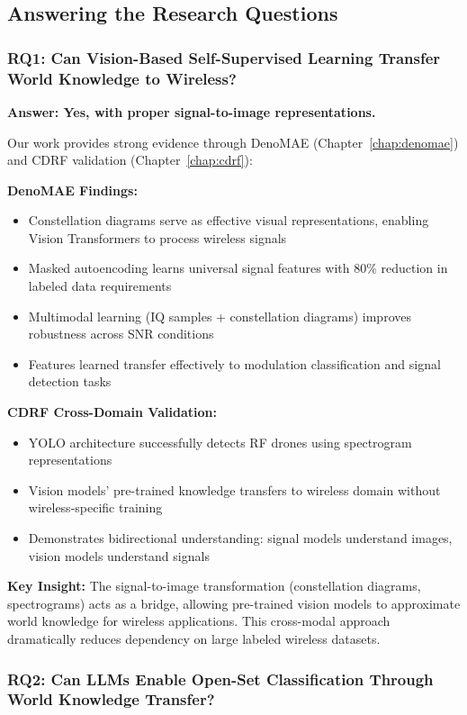 \subsection{Answering the Research Questions}

\subsubsection{RQ1: Can Vision-Based Self-Supervised Learning Transfer World Knowledge to Wireless?}

\textbf{Answer: Yes, with proper signal-to-image representations.}

Our work provides strong evidence through DenoMAE (Chapter~\ref{chap:denomae}) and CDRF validation (Chapter~\ref{chap:cdrf}):

\textbf{DenoMAE Findings:}
\begin{itemize}
    \item Constellation diagrams serve as effective visual representations, enabling Vision Transformers to process wireless signals
    \item Masked autoencoding learns universal signal features with 80\% reduction in labeled data requirements
    \item Multimodal learning (IQ samples + constellation diagrams) improves robustness across SNR conditions
    \item Features learned transfer effectively to modulation classification and signal detection tasks
\end{itemize}

\textbf{CDRF Cross-Domain Validation:}
\begin{itemize}
    \item YOLO architecture successfully detects RF drones using spectrogram representations
    \item Vision models' pre-trained knowledge transfers to wireless domain without wireless-specific training
    \item Demonstrates bidirectional understanding: signal models understand images, vision models understand signals
\end{itemize}

\textbf{Key Insight:} The signal-to-image transformation (constellation diagrams, spectrograms) acts as a bridge, allowing pre-trained vision models to approximate world knowledge for wireless applications. This cross-modal approach dramatically reduces dependency on large labeled wireless datasets.

\subsubsection{RQ2: Can LLMs Enable Open-Set Classification Through World Knowledge Transfer?}

